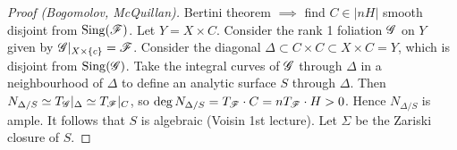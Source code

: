 \begin{proof}[Proof (Bogomolov, McQuillan)]
    Bertini theorem $\implies$ find $C\in|nH|$ smooth disjoint from
    $\operatorname{Sing}(\mathscr{F})$. Let $Y=X\times C$. Consider the rank 1 foliation $\mathscr{G}$ on
    $Y$ given by $\mathscr{G}|_{X\times\{c\}}=\mathscr{F}$. Consider the diagonal
    $\Delta\subset C\times C\subset X\times C=Y$, which is disjoint from
    $\operatorname{Sing}(\mathscr{G})$. Take the integral curves of $\mathscr{G}$ through $\Delta$ in a
    neighbourhood of $\Delta$ to define an analytic surface $S$ through
    $\Delta$. Then $N_{\Delta/S}\simeq T_{\mathscr{G}}|_\Delta\simeq T_{\mathscr{F}}|_C$, so
    $\deg N_{\Delta/S}=T_{\mathscr{F}}\cdot C=nT_{\mathscr{F}}\cdot H>0$. Hence $N_{\Delta/S}$
    is ample. It follows that $S$ is algebraic (Voisin 1st lecture). Let
    $\Sigma$ be the Zariski closure of $S$.
\end{proof}

